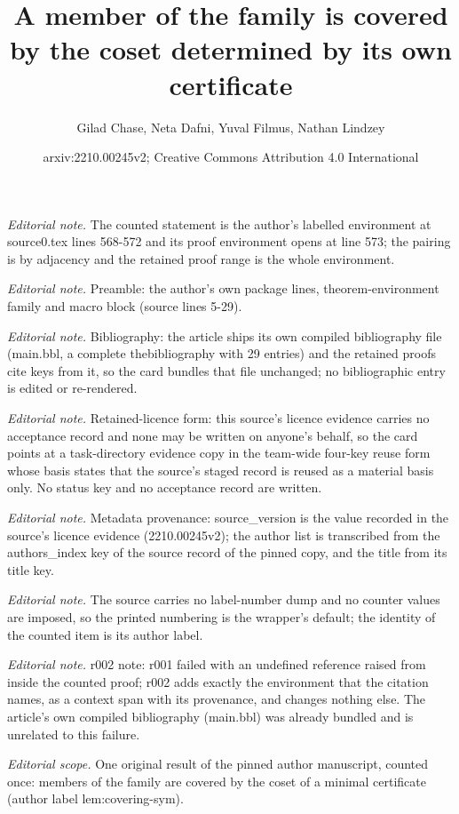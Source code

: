 \documentclass[10pt,a4paper]{article}
\title{A member of the family is covered by the coset determined by its own certificate}
\author{Gilad Chase, Neta Dafni, Yuval Filmus, Nathan Lindzey}
\date{arxiv:2210.00245v2; Creative Commons Attribution 4.0 International}
\theoremstyle{definition}
\begin{document}
\maketitle
\noindent\textit{Editorial note.} The counted statement is the author's labelled environment at source0.tex lines 568-572 and its proof environment opens at line 573; the pairing is by adjacency and the retained proof range is the whole environment.\par\medskip
\noindent\textit{Editorial note.} Preamble: the author's own package lines, theorem-environment family and macro block (source lines 5-29).\par\medskip
\noindent\textit{Editorial note.} Bibliography: the article ships its own compiled bibliography file (main.bbl, a complete thebibliography with 29 entries) and the retained proofs cite keys from it, so the card bundles that file unchanged; no bibliographic entry is edited or re-rendered.\par\medskip
\noindent\textit{Editorial note.} Retained-licence form: this source's licence evidence carries no acceptance record and none may be written on anyone's behalf, so the card points at a task-directory evidence copy in the team-wide four-key reuse form whose basis states that the source's staged record is reused as a material basis only. No status key and no acceptance record are written.\par\medskip
\noindent\textit{Editorial note.} Metadata provenance: source\_version is the value recorded in the source's licence evidence (2210.00245v2); the author list is transcribed from the authors\_index key of the source record of the pinned copy, and the title from its title key.\par\medskip
\noindent\textit{Editorial note.} The source carries no label-number dump and no counter values are imposed, so the printed numbering is the wrapper's default; the identity of the counted item is its author label.\par\medskip
\noindent\textit{Editorial note.} r002 note: r001 failed with an undefined reference raised from inside the counted proof; r002 adds exactly the environment that the citation names, as a context span with its provenance, and changes nothing else. The article's own compiled bibliography (main.bbl) was already bundled and is unrelated to this failure.\par\medskip
\noindent\textit{Editorial scope.} One original result of the pinned author manuscript, counted once: members of the family are covered by the coset of a minimal certificate (author label lem:covering-sym).\par\medskip
\end{document}
